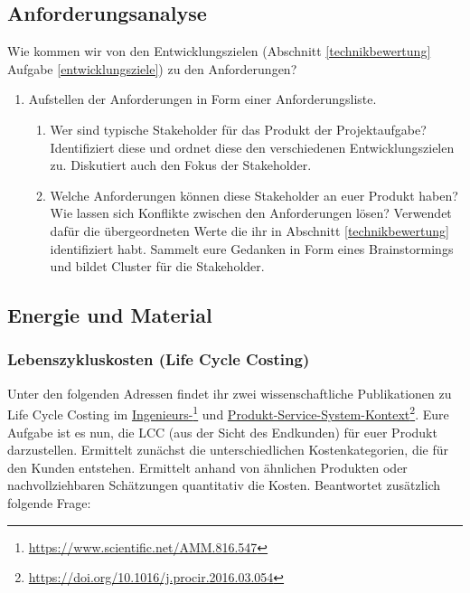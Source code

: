 \documentclass[headinclude=true]{scrartcl}
\begin{document}
\subsection{Anforderungsanalyse}

Wie kommen wir von den Entwicklungszielen (Abschnitt \ref{technikbewertung} Aufgabe
\ref{entwicklungsziele}) zu den Anforderungen?

\begin{enumerate}
	\item
	      Aufstellen der Anforderungen in Form einer Anforderungsliste.
	      \begin{enumerate}
		      \item
		            Wer sind typische Stakeholder für das Produkt der Projektaufgabe?
		            Identifiziert diese und ordnet diese den verschiedenen
		            Entwicklungszielen zu. Diskutiert auch den Fokus der Stakeholder.
		      \item
		            Welche Anforderungen können diese Stakeholder an euer Produkt  haben? Wie lassen sich Konflikte zwischen den
		            Anforderungen lösen? Verwendet dafür die übergeordneten Werte die ihr in Abschnitt \ref{technikbewertung} identifiziert habt. Sammelt eure Gedanken in Form eines Brainstormings
		            und bildet Cluster für die Stakeholder.
	      \end{enumerate}
\end{enumerate}

\subsection{Energie und Material}
\label{energie_material}

\subsubsection{Lebenszykluskosten (Life Cycle Costing)}

Unter den folgenden Adressen findet ihr zwei wissenschaftliche Publikationen zu Life Cycle Costing im \href{https://www.scientific.net/AMM.816.547}{Ingenieurs-}\footnote{\url{https://www.scientific.net/AMM.816.547}} und \href{https://doi.org/10.1016/j.procir.2016.03.054}{Produkt-Service-System-Kontext}\footnote{\url{https://doi.org/10.1016/j.procir.2016.03.054}}. Eure Aufgabe ist es nun, die LCC (aus der Sicht des Endkunden) für euer Produkt darzustellen. Ermittelt zunächst die unterschiedlichen Kostenkategorien, die für den Kunden entstehen. Ermittelt anhand von ähnlichen Produkten oder nachvollziehbaren Schätzungen quantitativ die Kosten. Beantwortet zusätzlich folgende Frage: 
\end{document}
